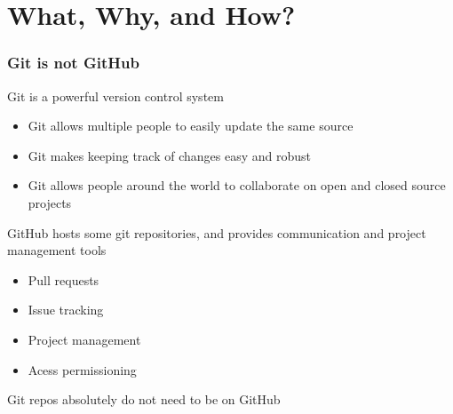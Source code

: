 \documentclass[unknownkeysallowed]{beamer}
\begin{document}
\section{What, Why, and How?}
\begin{frame}
    \frametitle{Git is not GitHub}
    \vspace{0.5cm} %
    Git is a powerful version control system
            \begin{itemize}
                \item{Git allows multiple people to easily update the same source}
                \item{Git makes keeping track of changes easy and robust}
       		\item{Git allows people around the world to collaborate on open and closed source projects}
            \end{itemize}
    \vspace{0.25cm}
    GitHub hosts some git repositories, and provides communication and project management tools
        \begin{itemize}
	    \item{Pull requests}
	    \item{Issue tracking}
	    \item{Project management}
	    \item{Acess permissioning}
    \end{itemize}
    \vspace{0.25cm}
	Git repos absolutely do not need to be on GitHub
\end{frame}
\end{document}
